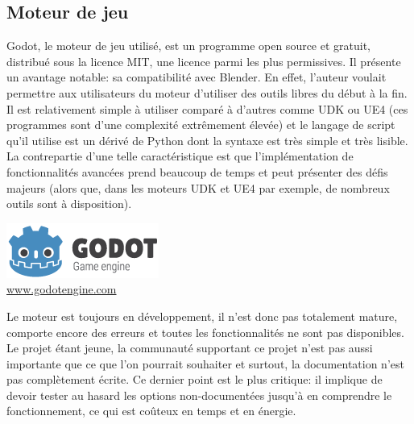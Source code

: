 \subsection{Moteur de jeu}
Godot, le moteur de jeu utilisé, est un programme open source et gratuit, distribué sous la licence MIT, une licence parmi les plus permissives. Il présente un avantage notable: sa compatibilité avec Blender. En effet, l'auteur voulait permettre aux utilisateurs du moteur d'utiliser des outils libres du début à la fin. Il est relativement simple à utiliser comparé à d'autres comme UDK ou UE4 (ces programmes sont d'une complexité extrêmement élevée) et le langage de script qu'il utilise est un dérivé de Python dont la syntaxe est très simple et très lisible. La contrepartie d'une telle caractéristique est que l'implémentation de fonctionnalités avancées prend beaucoup de temps et peut présenter des défis majeurs (alors que, dans les moteurs UDK et UE4 par exemple, de nombreux outils sont à disposition).

\begin{center}
	\includegraphics[width=.5\textwidth]{./images/Technique/godot_icone.png}
	\\[-1mm]\url{www.godotengine.com}
\end{center}

Le moteur est toujours en développement, il n'est donc pas totalement mature, comporte encore des erreurs et toutes les fonctionnalités ne sont pas disponibles. Le projet étant jeune, la communauté supportant ce projet n'est pas aussi importante que ce que l'on pourrait souhaiter et surtout, la documentation n'est pas complètement écrite. Ce dernier point est le plus critique: il implique de devoir tester au hasard les options non-documentées jusqu'à en comprendre le fonctionnement, ce qui est coûteux en temps et en énergie.




